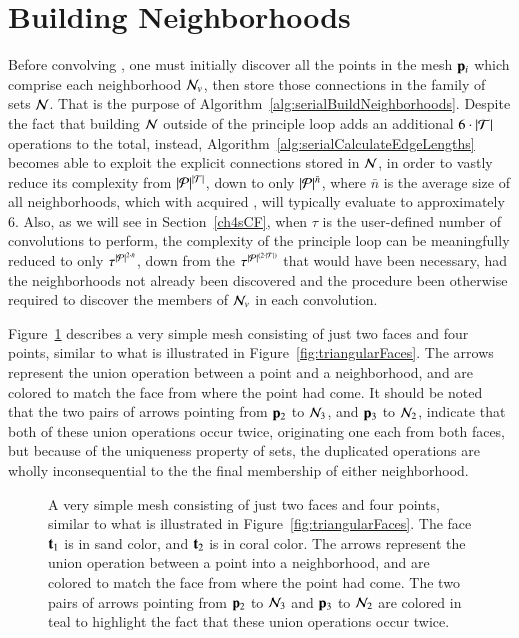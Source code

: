 %
%
%
%
\section{Building Neighborhoods}
\label{ch4sBN}
Before convolving , one must initially discover all the points in the mesh $\mathbf{p}_i$ which comprise each neighborhood $\mathcal{N}_v$, then store those connections in the family of sets $\mathcal{N}$. That is the purpose of Algorithm~\ref{alg:serialBuildNeighborhoods}. Despite the fact that building $\mathcal{N}$ outside of the principle loop adds an additional $6\cdot|\mathcal{T}|$ operations to the total, instead, Algorithm~\ref{alg:serialCalculateEdgeLengths} becomes able to exploit the explicit connections stored in $\mathcal{N}$, in order to vastly reduce its complexity from $|\mathcal{P}|^{|\mathcal{T}|}$, down to only $|\mathcal{P}|^{\bar{n}}$, where $\bar{n}$ is the average size of all neighborhoods, which with acquired \tdd{}, will typically evaluate to approximately 6. Also, as we will see in Section~\ref{ch4sCF}, when $\tau$ is the user-defined number of convolutions to perform, the complexity of the principle loop can be meaningfully reduced to only $\tau^{|\mathcal{P}|^{2\cdot\bar{n}}}$, down from the $\tau^{|\mathcal{P}|^{(2\cdot|\mathcal{T}|)}}$ that would have been necessary, had the neighborhoods not already been discovered and the procedure been otherwise required to discover the members of $\mathcal{N}_v$ in each convolution.%
%

Figure~\ref{fig:unionsOfSimpleBuildNeighborhoods} describes a very simple mesh consisting of just two faces and four points, similar to what is illustrated in Figure~\ref{fig:triangularFaces}. The arrows represent the union operation between a point and a neighborhood, and are colored to match the face from where the point had come. It should be noted that the two pairs of arrows pointing from $\mathbf{p}_2$ to $\mathcal{N}_3$, and $\mathbf{p}_3$ to $\mathcal{N}_2$, indicate that both of these union operations occur twice, originating one each from both faces, but because of the uniqueness property of sets, the duplicated operations are wholly inconsequential to the the final membership of either neighborhood.

\begin{figure}[ht]
	
	{\caption[unionsOfSimpleBuildNeighborhoods]{A very simple mesh consisting of just two faces and four points, similar to what is illustrated in Figure~\ref{fig:triangularFaces}. The face $\mathbf{t}_1$ is in sand color, and $\mathbf{t}_2$ is in coral color. The arrows represent the union operation between a point into a neighborhood, and are colored to match the face from where the point had come. The two pairs of arrows pointing from $\mathbf{p}_2$ to $\mathcal{N}_3$ and $\mathbf{p}_3$ to $\mathcal{N}_2$ are colored in teal to highlight the fact that these union operations occur twice.
}\label{fig:unionsOfSimpleBuildNeighborhoods}}
\end{figure}

